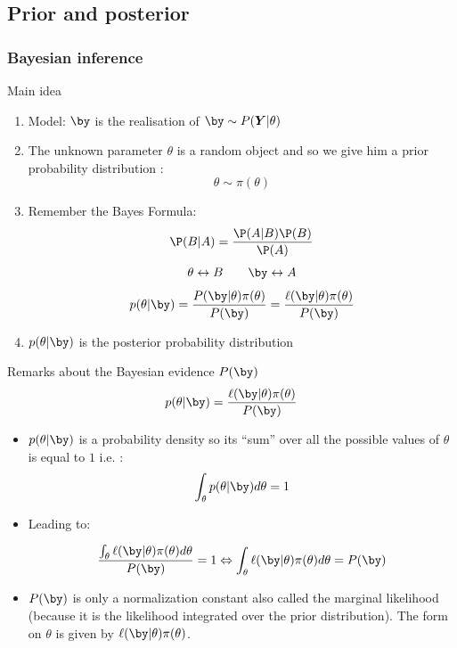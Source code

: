 \subsection{Prior and posterior}

\begin{frame}\frametitle{Bayesian inference}
\begin{block}{Main idea}

\begin{enumerate}
\item \vert Model\noir: $\by$ is the realisation of $\by  \sim P(\boldsymbol{Y} | \theta)$
\item The unknown parameter $\theta$ is a random object and so we give him a \vert prior probability distribution \noir : 
$$\theta \sim \pi(\theta)$$ 
\item  Remember the \vert Bayes Formula:  \noir 
$$ \P( B | A ) = \frac{\P( A| B ) \P(B)}{\P(A)}$$  
$$ \theta \leftrightarrow B \quad \quad  \by \leftrightarrow A $$
$$ p(\theta | \by) = \frac{P(\by | \theta)\pi(\theta)}{P(\by)} =  \frac{\ell(\by | \theta)\pi(\theta)}{P(\by)} $$ 
\item $p(\theta | \by)$ is the \vert posterior probability distribution
\end{enumerate}
\end{block}
\end{frame}

\begin{frame}{Remarks about  the Bayesian evidence $P(\by)$}
$$ p(\theta | \by) = \frac{\ell(\by | \theta)\pi(\theta)}{P(\by)} $$ 

\begin{itemize}
\item $p(\theta | \by)$ is a probability density  so its ``sum'' over all the possible values of $\theta$ is equal to $1$ i.e. : 
$$ \int_{\theta} p(\theta | \by) d\theta  = 1$$ 
\item Leading to: 

$$ \frac{\int_{\theta}\ell(\by | \theta)\pi(\theta) d\theta}{P(\by)} =1 \Leftrightarrow   \int_{\theta}\ell(\by| \theta)\pi(\theta) d\theta = P(\by) $$ 

\item $P(\by)$ is  only a normalization constant also called the \vert marginal likelihood \noir (because it is the likelihood integrated over the prior distribution). The form on $\theta$ is given by 
$\ell(\by | \theta)\pi(\theta)$. 
\end{itemize}
\end{frame}

